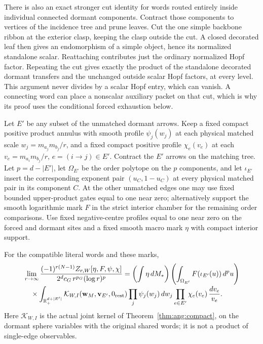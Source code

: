 There is also an exact stronger cut identity for words routed
entirely inside individual connected dormant components. Contract
those components to vertices of the incidence tree and prune leaves.
Cut the one simple backbone ribbon at the exterior clasp, keeping
the clasp outside the cut. A closed decorated leaf then gives an
endomorphism of a simple object, hence its normalized standalone
scalar. Reattaching contributes just the ordinary normalized Hopf
factor. Repeating the cut gives exactly the product of the standalone
decorated dormant transfers and the unchanged outside scalar Hopf
factors, at every level. This argument never divides by a scalar
Hopf entry, which can vanish. A connecting word can place a nonscalar
auxiliary packet on that cut, which is why its proof uses the
conditional forced exhaustion below.

Let \(E'\) be any subset of the unmatched dormant arrows. Keep a fixed
compact positive product annulus with smooth profile \(\psi_j(w_j)\)
at each physical matched scale
\(w_j=m_{a_j}m_{b_j}/r\), and a fixed compact positive profile
\(\chi_e(v_e)\) at each \(v_e=m_{a_i}m_{b_j}/r\), \(e=(i\to j)\in E'\).
Contract the \(E'\) arrows on the matching tree. Let \(p=d-|E'|\),
let \(\Omega_{E'}\) be the order polytope on the \(p\) components, and
let \(\iota_{E'}\) insert the corresponding exponent pair
\((u_C,1-u_C)\) at every physical matched pair in its component $C$.
At the other unmatched edges one may use fixed bounded upper-product
gates equal to one near zero; alternatively support the smooth
logarithmic mark \(F\) in the strict interior chamber for the
remaining order comparisons. Use fixed negative-centre profiles
equal to one near zero on the forced and dormant sites and a fixed
smooth macro mark \(\eta\) with compact interior support.

\begin{theorem}
\label{thm:hall:overlap}
For the compatible literal words and these marks,
\begin{align}
 &\lim_{r\to\infty}
 \frac{(-1)^{r(N-1)}Z_{r,W}[\eta,F,\psi,\chi]}
      {2^d c_G\,r^{p_G}(\log r)^p}
 =\left(\int\eta\,dM_*\right)
  \left(\int_{\Omega_{E'}}F(\iota_{E'}(u))\,d^pu\right)
 \notag\\[-0.2em]
 &\quad{}\times
  \int_{\mathbb R_+^{d+|E'|}}
    \mathcal K_{W,I}(\mathbf w_M,\mathbf v_{E'},0_{\rm rest})
    \prod_j\psi_j(w_j)\,dw_j
    \prod_{e\in E'}\chi_e(v_e)\,\frac{dv_e}{v_e}.
 \label{eq:hall:overlap}
\end{align}
Here \(\mathcal K_{W,I}\) is the actual joint kernel of
Theorem~\ref{thm:ang:compact}, on the dormant sphere variables with the
original shared words; it is not a product of single-edge observables.
\end{theorem}

